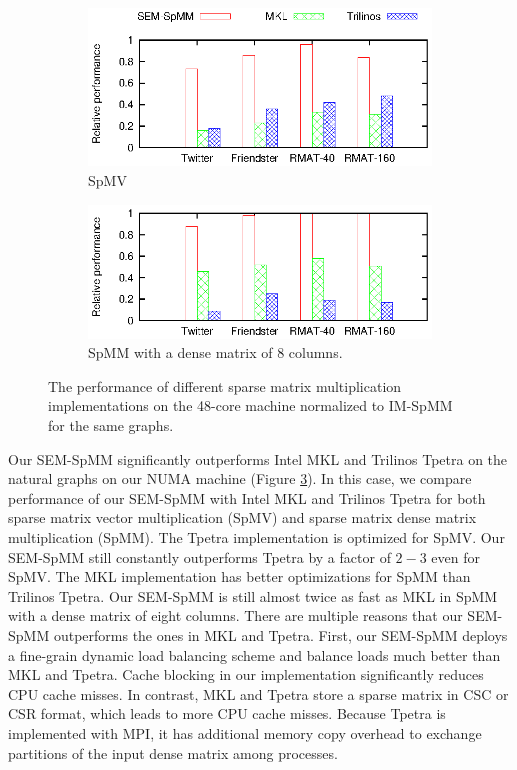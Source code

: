 \begin{figure}
	\footnotesize
	\centering
	\begin{subfigure}[b]{0.5\textwidth}
		\centering
		\includegraphics[scale=1]{SpMM_figs/SpMV-awesomer.eps}
		\vspace{-5pt}
		\caption{SpMV}
		\label{perf:spmv}
	\end{subfigure}
	\begin{subfigure}[b]{0.5\textwidth}
		\centering
		\includegraphics[scale=1]{SpMM_figs/SpMM-awesomer.eps}
		\vspace{-5pt}
		\caption{SpMM with a dense matrix of 8 columns.}
		\label{perf:spmm8}
	\end{subfigure}
	\vspace{3pt}
	\caption{The performance of different sparse matrix multiplication
		implementations on the 48-core machine normalized to IM-SpMM for
	the same graphs.}
	\label{perf:spmm}
\end{figure}

Our SEM-SpMM significantly outperforms Intel MKL and Trilinos Tpetra on the natural
graphs on our NUMA machine (Figure \ref{perf:spmm}). In this case, we compare
performance of our SEM-SpMM with Intel MKL and Trilinos Tpetra for both sparse matrix
vector multiplication (SpMV) and sparse matrix dense matrix multiplication (SpMM).
The Tpetra implementation is optimized for SpMV. Our SEM-SpMM still constantly
outperforms Tpetra by a factor of $2-3$ even for SpMV. The MKL implementation has
better optimizations for SpMM than Trilinos Tpetra. Our SEM-SpMM is still almost
twice as fast as MKL in SpMM with a dense matrix of eight columns. There are
multiple reasons that our SEM-SpMM outperforms the ones in MKL and Tpetra.
First, our SEM-SpMM deploys a fine-grain dynamic load balancing scheme and
balance loads much better than MKL and Tpetra. Cache blocking in our
implementation significantly reduces CPU cache misses.
In contrast, MKL and Tpetra store a sparse matrix in CSC or CSR format,
which leads to more CPU cache misses. Because Tpetra
is implemented with MPI, it has additional memory copy overhead to exchange
partitions of the input dense matrix among processes.

